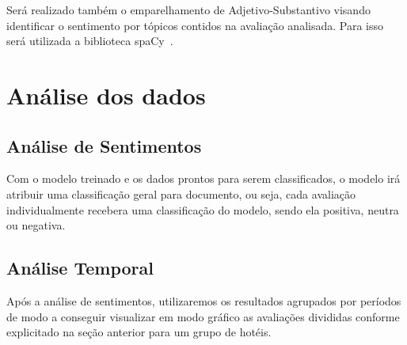 Será realizado também o emparelhamento de Adjetivo-Substantivo visando identificar o sentimento por tópicos contidos na avaliação analisada. Para isso será utilizada a biblioteca spaCy~\cite{montani2022spacy}.

\section{Análise dos dados}

\subsection{Análise de Sentimentos}
\label{subsec:analise_sentimentos}

Com o modelo treinado e os dados prontos para serem classificados, o modelo irá atribuir uma classificação geral para documento, ou seja, cada avaliação individualmente recebera uma classificação do modelo, sendo ela positiva, neutra ou negativa.

\subsection{Análise Temporal}
\label{subsec:analise_temporal}
Após a análise de sentimentos, utilizaremos os resultados agrupados por períodos de modo a conseguir visualizar em modo gráfico as avaliações divididas conforme explicitado na seção anterior para um grupo de hotéis.
